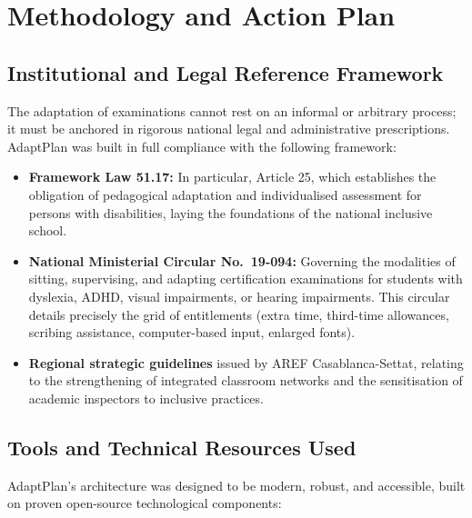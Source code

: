 \documentclass[12pt,a4paper]{report}
\begin{document}
\newpage

\chapter{Methodology and Action Plan}

\section{Institutional and Legal Reference Framework}

The adaptation of examinations cannot rest on an informal or arbitrary process; it must be anchored in rigorous national legal and administrative prescriptions. AdaptPlan was built in full compliance with the following framework:

\begin{itemize}[leftmargin=*]
  \item \textbf{Framework Law 51.17:} In particular, Article 25, which establishes the obligation of pedagogical adaptation and individualised assessment for persons with disabilities, laying the foundations of the national inclusive school.
  \item \textbf{National Ministerial Circular No.\ 19-094:} Governing the modalities of sitting, supervising, and adapting certification examinations for students with dyslexia, ADHD, visual impairments, or hearing impairments. This circular details precisely the grid of entitlements (extra time, third-time allowances, scribing assistance, computer-based input, enlarged fonts).
  \item \textbf{Regional strategic guidelines} issued by AREF Casablanca-Settat, relating to the strengthening of integrated classroom networks and the sensitisation of academic inspectors to inclusive practices.
\end{itemize}

\section{Tools and Technical Resources Used}

AdaptPlan's architecture was designed to be modern, robust, and accessible, built on proven open-source technological components:
\end{document}
